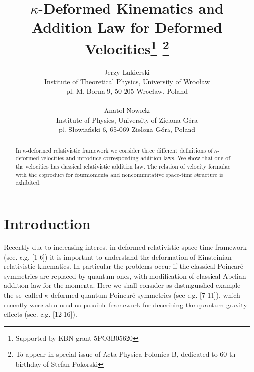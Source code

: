 \documentclass[a4paper,12pt]{article}
\begin{document}
\title{$\kappa$-Deformed Kinematics and Addition Law
for Deformed Velocities\thanks{Supported by KBN grant
5PO3B05620}
\thanks{To appear in special issue of Acta Physica
Polonica B, dedicated to 60-th birthday of Stefan Pokorski}}
\author{Jerzy Lukierski\\
Institute of Theoretical Physics, University of Wroc\l aw \\ pl. M. Borna 9,
50-205 Wroc\l aw, Poland
\\ \\
Anatol Nowicki \\ Institute of Physics, University of Zielona
G\'{o}ra\\ pl. S\l owia\'{n}ski 6, 65-069 Zielona G\'{o}ra,
Poland}

\maketitle
\begin{abstract}
In $\kappa$-deformed relativistic framework we consider three
different definitions of $\kappa$-deformed  velocities  and
introduce corresponding addition laws. We show that one of the
velocities has classical relativistic addition law. The relation
of velocity formulae with the coproduct  for fourmomenta and
noncommutative space-time structure is exhibited.
\end{abstract}

\section{Introduction}
Recently due to increasing interest in deformed relativistic space-time
framework (see. e.g. [1-6]) it is important to understand the deformation of
Einsteinian relativistic kinematics. In particular the problems occur if the
classical Poincar\'{e} symmetries are replaced by quantum ones, with
modification of classical Abelian addition law for the momenta. Here we shall
consider as distinguished example the so--called $\kappa$-deformed quantum
Poincar\'{e} symmetries (see e.g. [7-11]), which recently were also used as
possible framework for describing the quantum gravity effects (see. e.g.
[12-16]).
\end{document}
